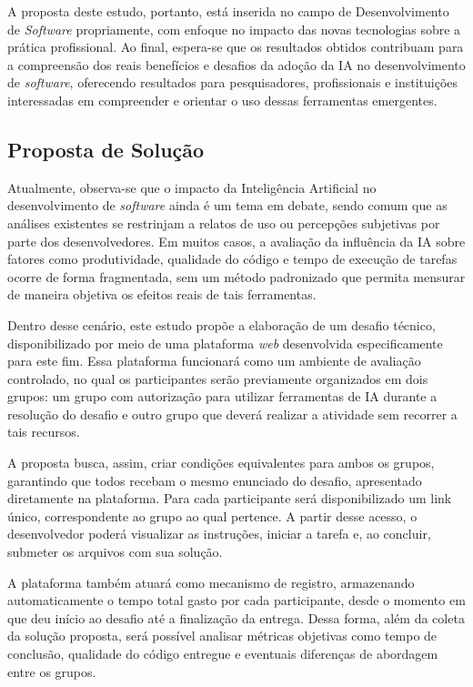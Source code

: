 \documentclass[english,brazilian]{UNISINOSartigo} %
\begin{document}
A proposta deste estudo, portanto, está inserida no campo de Desenvolvimento de \textit{Software} propriamente, com enfoque no impacto das novas tecnologias sobre a prática profissional. Ao final, espera-se que os resultados obtidos contribuam para a compreensão dos reais benefícios e desafios da adoção da IA no desenvolvimento de \textit{software}, oferecendo resultados para pesquisadores, profissionais e instituições interessadas em compreender e orientar o uso dessas ferramentas emergentes.

\subsection{Proposta de Solução}

Atualmente, observa-se que o impacto da Inteligência Artificial no desenvolvimento de \textit{software} ainda é um tema em debate, sendo comum que as análises existentes se restrinjam a relatos de uso ou percepções subjetivas por parte dos desenvolvedores. Em muitos casos, a avaliação da influência da IA sobre fatores como produtividade, qualidade do código e tempo de execução de tarefas ocorre de forma fragmentada, sem um método padronizado que permita mensurar de maneira objetiva os efeitos reais de tais ferramentas.

Dentro desse cenário, este estudo propõe a elaboração de um desafio técnico, disponibilizado por meio de uma plataforma \textit{web} desenvolvida especificamente para este fim. Essa plataforma funcionará como um ambiente de avaliação controlado, no qual os participantes serão previamente organizados em dois grupos: um grupo com autorização para utilizar ferramentas de IA durante a resolução do desafio e outro grupo que deverá realizar a atividade sem recorrer a tais recursos.

A proposta busca, assim, criar condições equivalentes para ambos os grupos, garantindo que todos recebam o mesmo enunciado do desafio, apresentado diretamente na plataforma. Para cada participante será disponibilizado um link único, correspondente ao grupo ao qual pertence. A partir desse acesso, o desenvolvedor poderá visualizar as instruções, iniciar a tarefa e, ao concluir, submeter os arquivos com sua solução.

A plataforma também atuará como mecanismo de registro, armazenando automaticamente o tempo total gasto por cada participante, desde o momento em que deu início ao desafio até a finalização da entrega. Dessa forma, além da coleta da solução proposta, será possível analisar métricas objetivas como tempo de conclusão, qualidade do código entregue e eventuais diferenças de abordagem entre os grupos.
\end{document}
